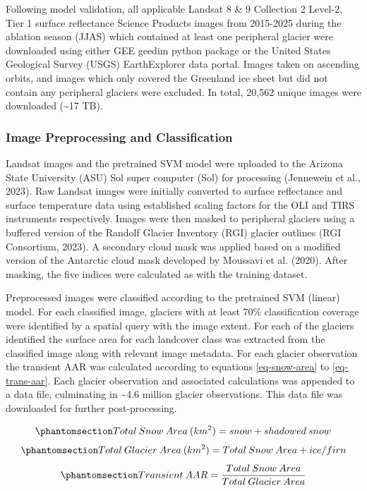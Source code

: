 \documentclass[
]{agujournal2019}
\begin{document}
Following model validation, all applicable Landsat 8 \& 9 Collection 2
Level-2, Tier 1 surface reflectance Science Products images from
2015-2025 during the ablation season (JJAS) which contained at least one
peripheral glacier were downloaded using either GEE geedim python
package or the United States Geological Survey (USGS) EarthExplorer data
portal. Images taken on ascending orbits, and images which only covered
the Greenland ice sheet but did not contain any peripheral glaciers were
excluded. In total, 20,562 unique images were downloaded
(\textasciitilde17 TB).

\subsubsection{Image Preprocessing and
Classification}\label{sec-classification}

Landsat images and the pretrained SVM model were uploaded to the
Arizona State University (ASU) Sol super computer (Sol) for processing
(Jennewein et al., 2023). Raw Landsat images were initially converted to
surface reflectance and surface temperature data using established
scaling factors for the OLI and TIRS instruments respectively. Images
were then masked to peripheral glaciers using a buffered version of the
Randolf Glacier Inventory (RGI) glacier outlines (RGI Consortium, 2023).
A secondary cloud mask was applied based on a modified version of the
Antarctic cloud mask developed by Moussavi et al. (2020). After masking,
the five indices were calculated as with the training dataset.

Preprocessed images were classified according to the pretrained SVM
(linear) model. For each classified image, glaciers with at least 70\%
classification coverage were identified by a spatial query with the
image extent. For each of the glaciers identified the surface area for
each landcover class was extracted from the classified image along with
relevant image metadata. For each glacier observation the transient AAR
was calculated according to equations \ref{eq-snow-area} to
\ref{eq-trans-aar}. Each glacier observation and associated calculations
was appended to a data file, culminating in \textasciitilde4.6 million
glacier observations. This data file was downloaded for further
post-processing.

\begin{equation}\phantomsection\label{eq-snow-area}{
Total\:Snow\:Area\:(km^2) = snow + shadowed\:snow
}\end{equation} \begin{equation}\phantomsection\label{eq-glacier-area}{
Total\:Glacier\:Area\:(km^2) = Total\:Snow\:Area + ice/firn
}\end{equation} \begin{equation}\phantomsection\label{eq-trans-aar}{
Transient\:AAR = \frac{Total\:Snow\:Area}{Total\:Glacier\:Area}
}\end{equation}
\end{document}
